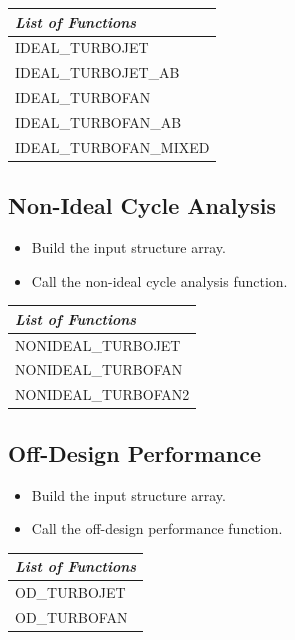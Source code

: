 \documentclass{article}
\begin{document}
\begin{tabular}{|l|} \hline
  \emph{List of Functions} \\ \hline
  IDEAL\_TURBOJET \\
  IDEAL\_TURBOJET\_AB \\
  IDEAL\_TURBOFAN \\
  IDEAL\_TURBOFAN\_AB \\
  IDEAL\_TURBOFAN\_MIXED \\ \hline
\end{tabular}

\subsection{Non-Ideal Cycle Analysis}
\begin{itemize}
\item Build the input structure array.
\item Call the non-ideal cycle analysis function.
\end{itemize}

\begin{tabular}{|l|} \hline
  \emph{List of Functions} \\ \hline
  NONIDEAL\_TURBOJET \\
  NONIDEAL\_TURBOFAN \\
  NONIDEAL\_TURBOFAN2 \\ \hline
\end{tabular}

\subsection{Off-Design Performance}
\begin{itemize}
\item Build the input structure array.
\item Call the off-design performance function.
\end{itemize}

\begin{tabular}{|l|} \hline
  \emph{List of Functions} \\ \hline
  OD\_TURBOJET \\
  OD\_TURBOFAN \\ \hline
\end{tabular}
\end{document}
